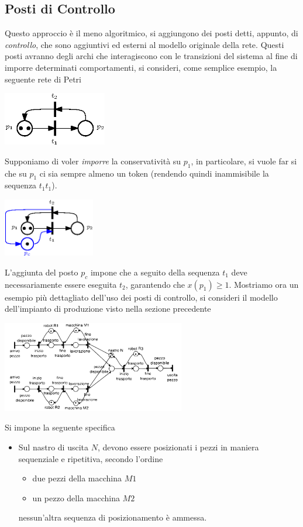 \documentclass[10pt, letterpaper]{report}
\begin{document}
\subsection{Posti di Controllo}
Questo approccio è il meno algoritmico, si aggiungono dei posti detti, appunto, di \textit{controllo}, che sono aggiuntivi ed esterni al modello originale della rete.  Questi posti avranno degli archi che interagiscono con le transizioni del sistema al fine di imporre determinati comportamenti, si consideri, come semplice esempio, la seguente rete di Petri 
\begin{center}
    \includegraphics[width=0.34\textwidth]{images/PetriControlloPosti1.eps}
\end{center}
Supponiamo di voler \textit{imporre} la conservatività su $p_1$, in particolare, si vuole far si che su $p_1$ ci sia sempre almeno un token (rendendo quindi inammisibile la sequenza $t_1t_1$).
\begin{center}
    \includegraphics[width=0.3\textwidth]{images/PetriControlloPosti2.eps}
\end{center}
L'aggiunta del posto $p_c$ impone che a seguito della sequenza $t_1$ deve necessariamente essere eseguita $t_2$, garantendo che $x(p_1)\ge 1$.\acc 
Mostriamo ora un esempio più dettagliato dell'uso dei posti di controllo, si consideri il modello dell'impianto di produzione visto nella sezione precedente
\begin{center}
    \includegraphics[width=0.6\textwidth]{images/modelloImpiantoPetri.pdf}
\end{center}
Si impone la seguente specifica\begin{itemize}
    \item Sul nastro di uscita $N$, devono essere posizionati i pezzi in maniera sequenziale e ripetitiva, secondo l'ordine\begin{itemize}
        \item due pezzi della macchina $M1$
        \item un pezzo della macchina $M2$
    \end{itemize}
    nessun'altra sequenza di posizionamento è ammessa.
\end{itemize}
\end{document}
